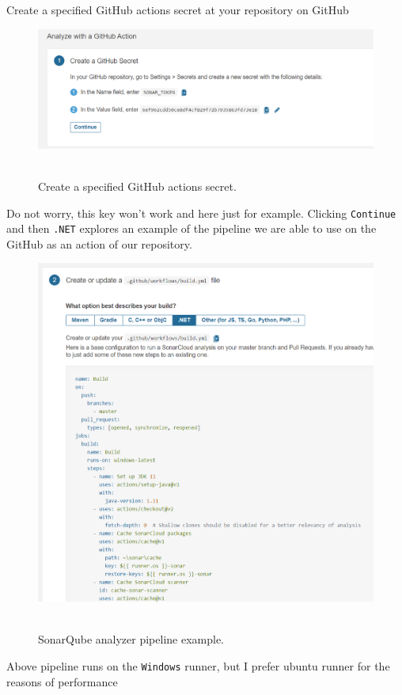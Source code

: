 Create a specified GitHub actions secret at your repository on GitHub
\begin{figure}[H]
    \centering
    \includegraphics[width=1\textwidth]{img/08_set_github_actions_secret}
    ~\caption{Create a specified GitHub actions secret.}\label{fig:figure8}
\end{figure}
Do not worry, this key won't work and here just for example.
Clicking \texttt{Continue} and then \texttt{.NET} explores an example of the pipeline we are able to use
on the GitHub as an action of our repository.
\begin{figure}[H]
    \centering
    \includegraphics[width=1\textwidth]{img/09_pipeline_example}
    ~\caption{SonarQube analyzer pipeline example.}\label{fig:figure9}
\end{figure}
Above pipeline runs on the \texttt{Windows} runner, but I prefer ubuntu runner for the reasons of performance

